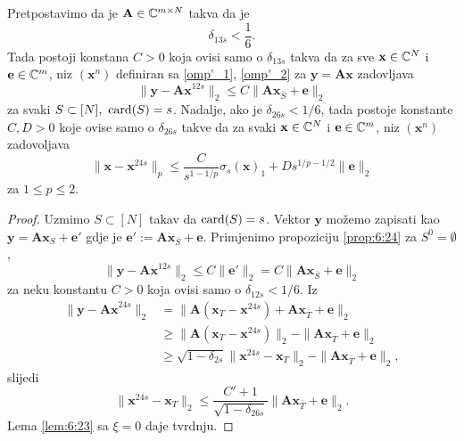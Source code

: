\documentclass[a4paper,twoside,12pt]{memoir} %
\newcommand{\vect}[1]{\mathbf{#1}}
\renewcommand{\vec}{\vect}
\newcommand{\card}{\text{\normalfont{card}}}
\newcommand{\norm}[1]{\|{#1}\|}
\begin{document}
\begin{thm}
    Pretpostavimo da je $\vec A \in \C^{m \times N}$ takva da je 
    \begin{equation*}
        \delta_{13s} < \frac{1}{6}. 
    \end{equation*}
    Tada postoji konstana $C>0$ koja ovisi samo o $\delta_{13s}$ takva da za sve $\vec x \in \C^N$ i $\vec e \in \C^m$, niz $(\vec x^n)$ definiran sa \eqref{omp'_1}, \eqref{omp'_2} za $\vec y = \vec{Ax}$ zadovljava
    \begin{equation*}
        \norm{\vec y - \vec{Ax}^{12s}}_2 \leq C \norm{\vec{Ax}_{\bar S} + \vec e}_2
    \end{equation*}
    za svaki $S \subset [N],\ \card(S) = s$. Nadalje, ako je $\delta_{26s} < 1/6$, tada postoje konstante $C,D>0$ koje ovise samo o $\delta_{26s}$ takve da za svaki $\vec x \in \C^N$ i $\vec e \in \C^m$, niz $(\vec x^n)$ zadovoljava
    \begin{equation*}
        \norm{\vec x - \vec x^{24s}}_p \leq \frac{C}{s^{1-1/p}} \sigma_s(\vec x)_1 + Ds^{1/p - 1/2} \norm{\vec e}_2  
    \end{equation*}
    za $1 \leq p \leq 2$.
\end{thm}
\begin{proof}
    Uzmimo $S \subset [N]$ takav da $\card(S)=s$. Vektor $\vec y$ mo\v{z}emo zapisati kao $\vec y = \vec{Ax}_S + \vec e'$ gdje je $\vec e' := \vec{Ax}_{\bar S} + \vec e$. Primjenimo propoziciju \ref{prop:6:24} za $S^0 = \emptyset$, 
    \begin{equation*}
        \norm{\vec y- \vec{Ax}^{12s}}_2 \leq C \norm{\vec e'}_2 = C \norm{\vec{Ax}_{\bar S} + \vec e}_2 
    \end{equation*}
    za neku konstantu $C>0$ koja ovisi samo o $\delta_{12s} < 1/6$. Iz 
    \begin{align*}
        \norm{\vec y - \vec{Ax}^{24s}}_2 & = \norm{\vec A(\vec x_T - \vec x^{24s}) + \vec{Ax}_{\bar T} + \vec e}_2\\[0.5em]
        & \geq \norm{\vec A(\vec x_T - \vec{x}^{24s})}_2 - \norm{\vec{Ax}_{\bar T} + \vec e}_2\\
        & \geq \sqrt{1 - \delta_{2s}} \norm{\vec x^{24s} - \vec x_T}_2 - \norm{\vec{Ax}_{\bar T} + \vec e}_2,
    \end{align*}
    slijedi
    \begin{equation*}
        \norm{\vec x^{24s} - \vec x_T}_2 \leq \frac{C'+1}{\sqrt{1 - \delta_{26s}}} \norm{\vec{Ax}_{\bar T} + \vec e}_2. 
    \end{equation*}
    Lema \ref{lem:6:23} sa $\xi = 0$ daje tvrdnju.
\end{proof}
\end{document}
